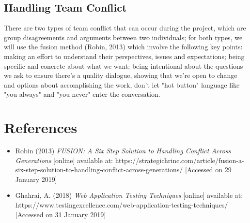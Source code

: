 \documentclass{article}
\begin{document}
	\subsection{Handling Team Conflict}
	There are two types of team conflict that can occur during the project, which are group disagreements and arguments between two individuals; for both types, we will use the fusion method (Robin, 2013) which involve the following key points:  making an effort to understand their perspectives, issues and expectations; being specific and concrete about what we want; being intentional about the questions we ask to ensure there's a quality dialogue, showing that we're open to change and options about accomplishing the work, don't let "hot button" language like "you always" and "you never" enter the conversation. 

\section{References}
\begin{itemize}
\item Robin (2013) \textit{FUSION: A Six Step Solution to Handling Conflict Across Generations} [online] available at: https://strategichrinc.com/article/fusion-a-six-step-solution-to-handling-conflict-across-generations/ [Accessed on 29 January 2019]
\item Ghahrai, A. (2018) \textit{Web Application Testing Techniques} [online] available at: https://www.testingexcellence.com/web-application-testing-techniques/ [Accessed on 31 January 2019]
\end{itemize}
\end{document}
